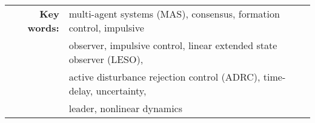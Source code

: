 \begin{abstract}
\end{abstract}

\noindent
\begin{tabular}{rl}
{\rmfamily\bfseries Key words:}&multi-agent systems (MAS), consensus, formation control, impulsive\\
                                               &observer, impulsive control, linear extended state observer (LESO), \\
                                               &active disturbance rejection control (ADRC), time-delay, uncertainty,\\
                                               & leader, nonlinear dynamics
\end{tabular}